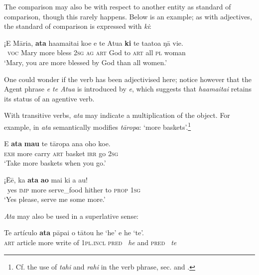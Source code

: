 The comparison may also be with respect to another entity as standard of comparison, though this rarely happens. Below is an example; as with adjectives, the standard of comparison is expressed with \textit{ki}:

\ea\label{ex:7.94}
\gll ¡E Māria, \textbf{{\ꞌ}ata} ha{\ꞌ}amaitai koe e te {\ꞌ}Atua \textbf{ki} te ta{\ꞌ}ato{\ꞌ}a ŋā vi{\ꞌ}e. \\
~\textsc{voc} Mary more bless \textsc{2sg} \textsc{ag} \textsc{art} God to \textsc{art} all \textsc{pl} woman \\

\glt
‘Mary, you are more blessed by God than all women.’ \textstyleExampleref{[Luke 1:42]}
\z

One could wonder if the verb has been adjectivised here; notice however that the Agent phrase \textit{e te {\ꞌ}Atua} is introduced by \textit{e}, which suggests that \textit{ha{\ꞌ}amaitai} retains its status of an agentive verb.

With transitive verbs, \textit{{\ꞌ}ata} may indicate a multiplication of the object. For example, in  \textit{{\ꞌ}ata} semantically modifies \textit{tāropa}: ‘more baskets’.\footnote{\label{fn:344}Cf. the use of \textit{tahi} and \textit{rahi} in the verb phrase, sec.  and .}

\ea\label{ex:7.95}
\gll E \textbf{{\ꞌ}ata} \textbf{ma{\ꞌ}u} te tāropa ana oho koe. \\
\textsc{exh} more carry \textsc{art} basket \textsc{irr} go \textsc{2sg} \\

\glt 
‘Take more baskets when you go.’ \textstyleExampleref{[MsE-064.013]}
\z

\ea\label{ex:7.96}
\gll ¡{\ꞌ}Ēē, ka \textbf{{\ꞌ}ata} \textbf{ao} mai ki a au! \\
~yes \textsc{imp} more serve\_food hither to \textsc{prop} \textsc{1sg} \\

\glt
‘Yes please, serve me some more.’ \textstyleExampleref{[R535.098]} 
\z

\textit{{\ꞌ}Ata} may also be used in a superlative sense:

\ea\label{ex:7.97}
\gll Te artículo \textbf{{\ꞌ}ata} pāpa{\ꞌ}i o tātou he ‘he’ {\ꞌ}e he ‘te’. \\
\textsc{art} article more write of \textsc{1pl.incl} \textsc{pred} \textit{~he} and \textsc{pred} \textit{~te} \\

